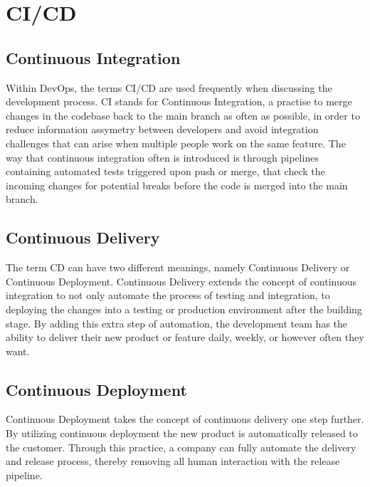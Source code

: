 \section{CI/CD}
  \subsection{Continuous Integration}
    Within DevOps, the terms CI/CD are used frequently when discussing the development process. CI stands for Continuous Integration, a practise to merge changes in the codebase back to the main branch as often as possible, in order to reduce information assymetry between developers and avoid integration challenges that can arise when multiple people work on the same feature. The way that continuous integration often is introduced is through pipelines containing automated tests triggered upon push or merge, that check the incoming changes for potential breaks before the code is merged into the main branch.\cite{Atlassian}

  \subsection{Continuous Delivery}
    The term CD can have two different meanings, namely Continuous Delivery or Continuous Deployment. Continuous Delivery extends the concept of continuous integration to not only automate the process of testing and integration, to deploying the changes into a testing or production environment after the building stage. By adding this extra step of automation, the development team has the ability to deliver their new product or feature daily, weekly, or however often they want.\cite{Atlassian}
  
  \subsection{Continuous Deployment}
    Continuous Deployment takes the concept of continuous delivery one step further. By utilizing continuous deployment the new product is automatically released to the customer. Through this practice, a company can fully automate the delivery and release process, thereby removing all human interaction with the release pipeline.\cite{Atlassian}
